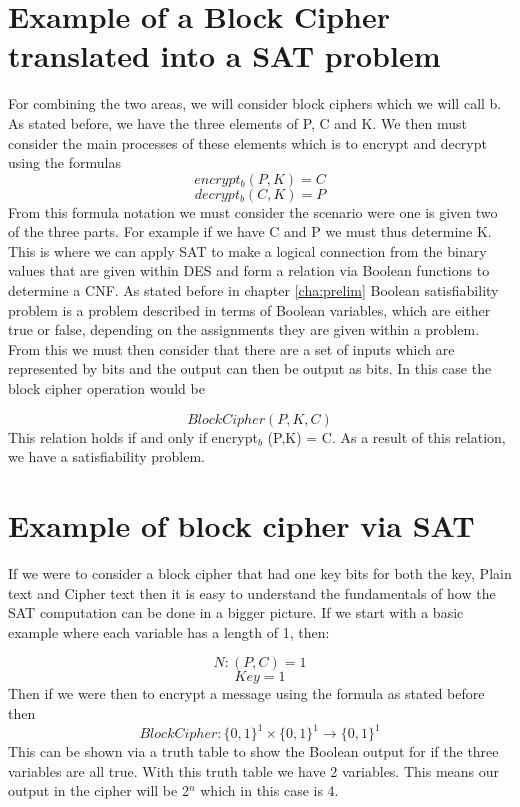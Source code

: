 \documentclass[11pt,a4paper]{report}
\begin{document}
\section{Example of a Block Cipher translated into a SAT problem}
For combining the two areas, we will consider block ciphers which we will call b. As stated before, we have the three elements of P, C and K. We then must consider the main processes of these elements which is to encrypt and decrypt using the formulas
\begin{displaymath}
encrypt_{b} (P,K) = C
\end{displaymath}
\begin{displaymath}
decrypt_{b} (C, K) = P
\end{displaymath}
From this formula notation we must consider the scenario were one is given two of the three parts. For example if we have C and P we must thus determine K. This is where we can apply SAT to make a logical connection from the binary values that are given within DES and form a relation via Boolean functions to determine a CNF.
As stated before in chapter \ref{cha:prelim} Boolean satisfiability problem is a problem described in terms of Boolean variables, which are either true or false, depending on the assignments they are given within a problem. From this we must then consider that there are a set of inputs which are represented by bits and the output can then be output as bits. In this case the block cipher operation would be

\begin{displaymath}
BlockCipher(P,K,C)
\end{displaymath}
This relation holds if and only if encrypt$_{b}$ (P,K) = C.
As a result of this relation, we have a satisfiability problem.

\section{Example of block cipher via SAT }
If we were to consider a block cipher that had one key bits for both the key, Plain text and Cipher text then it is easy to understand the fundamentals of how the SAT computation can be done in a bigger picture. If we start with a basic example where each variable has a length of 1, then:

\begin{displaymath}
N: (P, C) = 1
\end{displaymath}
\begin{displaymath}
Key = 1
\end{displaymath}
Then if we were then to encrypt a message using the formula as stated before then
\begin{displaymath}
BlockCipher: \{0,1\}^{1} \times \{0,1\}^1 \rightarrow \{0,1\}^1
\end{displaymath}
This can be shown via a truth table to show the Boolean output for if the three variables are all true. With this truth table we have 2 variables. This means our output in the cipher will be 2$^{n}$ which in this case is 4.
\end{document}
